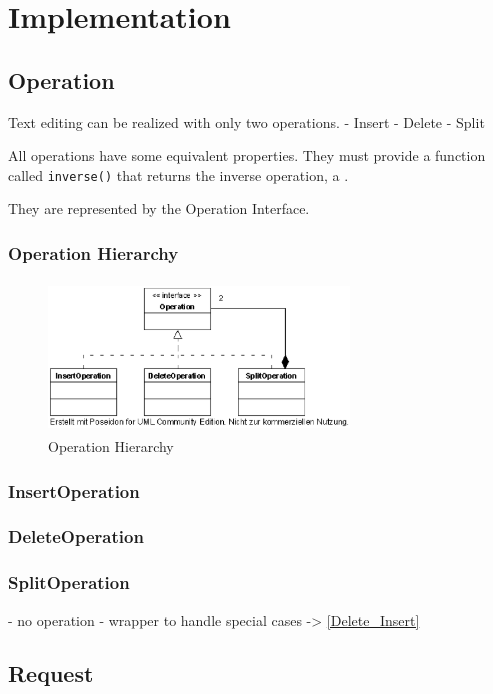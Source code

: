 
\section{Implementation}


\subsection{Operation}
Text editing can be realized with only two operations. 
 - Insert
 - Delete
 - Split

All operations have some equivalent properties. They must provide a function called \texttt{inverse()} that returns the inverse operation, a . 

They are represented by the Operation Interface.
 
\subsubsection{Operation Hierarchy}
\begin{figure}[H]
\centering
\includegraphics[height=4cm,width=8cm]{../../images/algo-impl/operation.eps}
\caption{Operation Hierarchy}
\end{figure}

\subsubsection{InsertOperation}


\subsubsection{DeleteOperation}
\subsubsection{SplitOperation}
  - no operation
  - wrapper to handle special cases -> \ref{Delete_Insert}


\subsection{Request}

